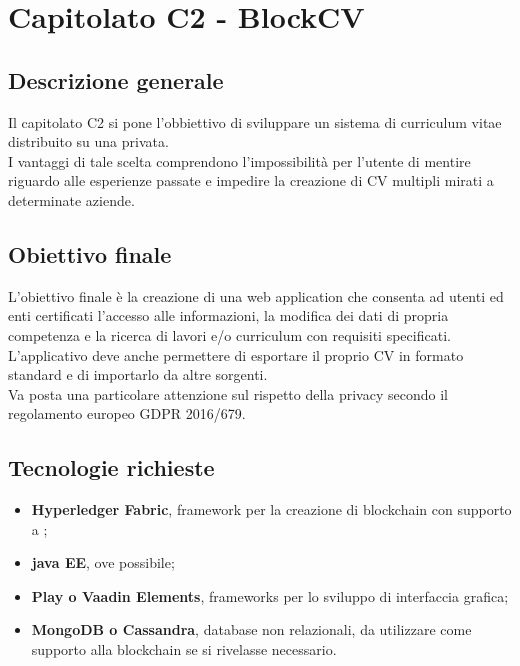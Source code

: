 \documentclass[StudioDiFattibilità.tex]{subfiles}
\begin{document}
\chapter{Capitolato C2 - BlockCV}
\section{Descrizione generale}
Il capitolato C2 si pone l'obbiettivo di sviluppare un sistema di curriculum vitae distribuito su una  privata.\\
I vantaggi di tale scelta comprendono l'impossibilità per l'utente di mentire riguardo alle esperienze passate e impedire la creazione di CV multipli mirati a determinate aziende.
\section{Obiettivo finale}
L'obiettivo finale è la creazione di una web application che consenta ad utenti ed enti certificati l'accesso alle informazioni, la modifica dei dati di propria competenza e la ricerca di lavori e/o curriculum con requisiti specificati.\\
L'applicativo deve anche permettere di esportare il proprio CV in formato standard e di importarlo da altre sorgenti.\\
Va posta una particolare attenzione sul rispetto della privacy secondo il regolamento europeo GDPR 2016/679.
\section{Tecnologie richieste}
\begin{itemize}
	\item \textbf{Hyperledger Fabric}, framework per la creazione di blockchain con supporto a ;
	\item \textbf{java EE}, ove possibile;
	\item \textbf{Play o Vaadin Elements}, frameworks per lo sviluppo di interfaccia grafica;
	\item \textbf{MongoDB o Cassandra}, database non relazionali, da utilizzare come supporto alla blockchain se si rivelasse necessario.
\end{itemize}
\end{document}
